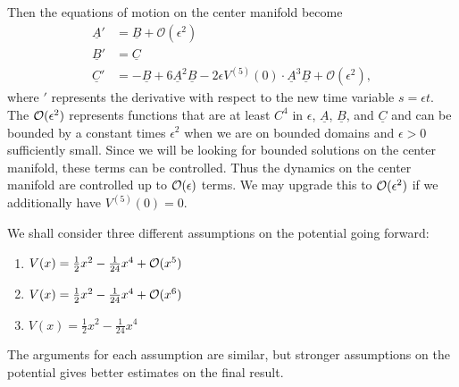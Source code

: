 Then the equations of motion on the center manifold become
\begin{equation}\label{eqns-center-manifold}
\begin{aligned}
	\underline A ' &= \underline B + \mathcal O(\epsilon^2) \\
	\underline B ' &= \underline C \\
	\underline C ' &= - \underline B + 6 \underline A^2 \underline B - 2 \epsilon V^{(5)}(0) \cdot \underline A^3\underline B +  \mathcal O(\epsilon^2),
\end{aligned}
\end{equation}
where \('\) represents the derivative with respect to the new time variable \(s = \epsilon t\). The \(\mathcal{O}(\epsilon^2)\) represents functions that are at least \(C^4\) in \(\epsilon\), \(\underline A\), \(\underline B\), and \(\underline C\) and can be bounded by a constant times \(\epsilon^2\) when we are on bounded domains and \(\epsilon >0\) sufficiently small. Since we will be looking for bounded solutions on the center manifold, these terms can be controlled. Thus the dynamics on the center manifold are controlled up to \(\mathcal{O}(\epsilon)\) terms. We may upgrade this to \(\mathcal{O}(\epsilon^2)\) if we additionally have \(V^{(5)}(0) = 0\).

We shall consider three different assumptions on the potential going forward:
\begin{enumerate}[label = (H\arabic*)]
	\item \(V(x) = \frac 12 x^2 - \frac 1 {24} x^4 + \mathcal{O}(x^5)\)
	\item \(V(x) = \frac 12 x^2 - \frac 1 {24} x^4 + \mathcal{O}(x ^6)\)
	\item \(V(x) = \frac 12 x^2 - \frac 1 {24} x^4\)
\end{enumerate}
The arguments for each assumption are similar, but stronger assumptions on the potential gives better estimates on the final result.

